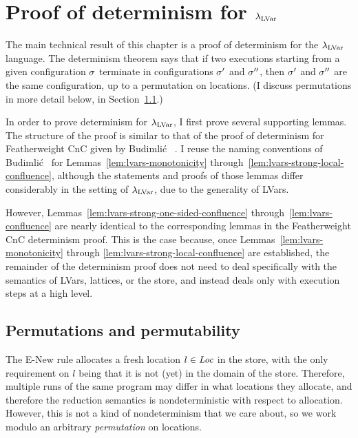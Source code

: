 \section{Proof of determinism for $\lambda_{\textrm{LVar}}$}\label{s:lvars-proof}

The main technical result of this chapter is a proof of determinism
for the $\lambda_{\textrm{LVar}}$ language.  The determinism theorem says that if
two executions starting from a given configuration $\sigma$ terminate
in configurations $\sigma'$ and $\sigma''$, then $\sigma'$ and $\sigma''$
are the same configuration, up to a permutation on locations.  (I
discuss permutations in more detail below, in
Section~\ref{subsection:lvars-permutations}.)

In order to prove determinism for $\lambda_{\textrm{LVar}}$, I first prove several
supporting lemmas.  The structure of the proof is similar to that of
the proof of determinism for Featherweight CnC given by Budimli\'c
\etal~\cite{CnC}.  I reuse the naming conventions of Budimli\'c
\etal~for Lemmas~\ref{lem:lvars-monotonicity}
through~\ref{lem:lvars-strong-local-confluence}, although the
statements and proofs of those lemmas differ considerably in the
setting of $\lambda_{\textrm{LVar}}$, due to the generality of LVars.

However, Lemmas~\ref{lem:lvars-strong-one-sided-confluence}
through~\ref{lem:lvars-confluence} are nearly identical to the
corresponding lemmas in the Featherweight CnC determinism proof.  This
is the case because, once Lemmas~\ref{lem:lvars-monotonicity} through
\ref{lem:lvars-strong-local-confluence} are established, the remainder
of the determinism proof does not need to deal specifically with the
semantics of LVars, lattices, or the store, and instead deals only
with execution steps at a high level.


\subsection{Permutations and permutability}\label{subsection:lvars-permutations}

The {\sc E-New} rule allocates a fresh location $l \in \mathit{Loc}$ in the
store, with the only requirement on $l$ being that it is not (yet) in
the domain of the store.  Therefore, multiple runs of the same program
may differ in what locations they allocate, and therefore the
reduction semantics is nondeterministic with respect to allocation.
However, this is not a kind of nondeterminism that we care about, so
we work modulo an arbitrary \emph{permutation} on locations.

